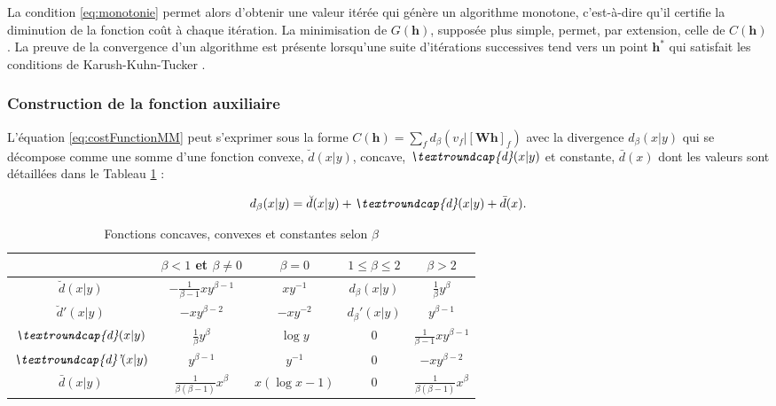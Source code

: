 La condition \ref{eq:monotonie} permet alors d'obtenir une valeur itérée qui génère un algorithme monotone, c'est-à-dire qu'il certifie la diminution de la fonction coût à chaque itération. La minimisation de $G(\mathbf{h})$, supposée plus simple, permet,  par extension, celle de $C(\mathbf{h})$. La preuve de la convergence d'un algorithme est présente lorsqu'une suite d'itérations successives tend vers un point $\mathbf{h^*}$ qui satisfait les conditions de Karush-Kuhn-Tucker \cite{fevotte_algorithms_2011, kuhn1982nonlinear}.

\subsubsection{Construction de la fonction auxiliaire}

L'équation \ref{eq:costFunctionMM} peut s'exprimer sous la forme $C(\mathbf{h}) = \sum_f d_{\beta}\left(v_f \vert \left[ \mathbf{Wh} \right]_f \right)$ avec la divergence $d_{\beta}(x \vert y)$ qui se décompose comme une somme d'une fonction convexe,  $\breve{d}(x\vert y)$, concave, $\textit{\textroundcap{d}}(x\vert y)$ et constante, $\bar{d}(x)$ dont les valeurs sont détaillées dans le Tableau \ref{tab:fonctionConcaveConvexe} :

\begin{equation}
d_{\beta}(x\vert y) = \breve{d}(x\vert y) + \textit{\textroundcap{d}}(x\vert y) + \bar{d}(x).
\end{equation}

\begin{table}[t]
\centering
	\begin{tabular}{|*{5}{c|}}
 		\hline
   		 & $\beta < 1$ et $\beta \neq 0$  & $\beta = 0$ & $1 \leq \beta \leq 2$ & $\beta > 2$  \\
   		\hline
   		$\breve{d}(x\vert y)$&$-\frac{1}{\beta -1}xy^{\beta-1}$ & $xy^{-1}$ & $d_{\beta}(x\vert y)$& $\frac{1}{\beta}y^{\beta}$ \\
   		\hline
   		$\breve{d}'(x\vert y)$& $-xy^{\beta-2}$ & $-xy^{-2}$ & $d_{\beta}'(x\vert y)$ & $y^{\beta-1}$\\
   		\hline
   		$\textit{\textroundcap{d}}(x\vert y)$& $\frac{1}{\beta}y^{\beta}$ & $\log y$ & 0 & $\frac{1}{\beta-1}xy^{\beta-1}$ \\
   		\hline
   		$\textit{\textroundcap{d}'}(x\vert y)$& $y^{\beta-1}$ & $y^{-1}$ & 0 & $-xy^{\beta-2}$ \\
   		\hline
   		$\bar{d}(x\vert y)$& $\frac{1}{\beta(\beta-1)}x^{\beta}$ & $x(\log x-1)$ & 0 & $\frac{1}{\beta(\beta-1)}x^{\beta}$\\
   		\hline
 	\end{tabular}
\caption{Fonctions concaves, convexes et constantes selon $\beta$}
\label{tab:fonctionConcaveConvexe}
\end{table}

